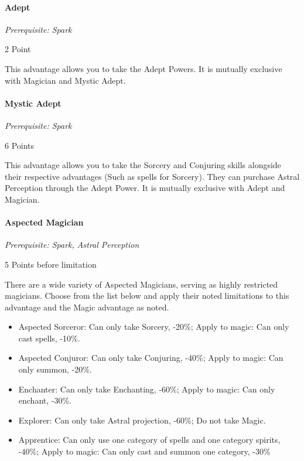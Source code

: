 \begin{multicols*}{3}
	\paragraph{Adept}
	\textit{Prerequisite: Spark}
	\begin{flushright}
		2 Point
	\end{flushright}
	
	This advantage allows you to take the Adept Powers. It is mutually exclusive with Magician and Mystic Adept.
	
	\paragraph{Mystic Adept}
	\textit{Prerequisite: Spark}
	\begin{flushright}
		6 Points
	\end{flushright}    
	
	This advantage allows you to take the Sorcery and Conjuring skills alongside their respective advantages (Such as spells for Sorcery). They can purchase Astral Perception through the Adept Power. It is mutually exclusive with Adept and Magician.
	
	\paragraph{Aspected Magician}
	\textit{Prerequisite: Spark, Astral Perception}
	\begin{flushright}
		5 Points before limitation
	\end{flushright}
	
	There are a wide variety of Aspected Magicians, serving as highly restricted magicians. Choose from the list below and apply their noted limitations to this advantage and the Magic advantage as noted.
	
	\begin{itemize}
		\itemsep0em 
		\item Aspected Sorceror: Can only take Sorcery, -20\%; Apply to magic: Can only cast spells, -10\%.
		\item Aspected Conjuror: Can only take Conjuring, -40\%; Apply to magic: Can only summon, -20\%.
		\item Enchanter: Can only take Enchanting, -60\%; Apply to magic: Can only enchant, -30\%.
		\item Explorer: Can only take Astral projection, -60\%; Do not take Magic.
		\item Apprentice: Can only use one category of spells and one category spirits, -40\%; Apply to magic: Can only cast and summon one category, -30\%
	\end{itemize}
	

\end{multicols*}
